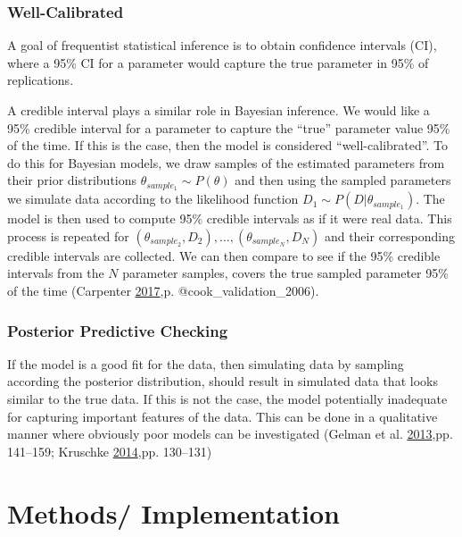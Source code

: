 \documentclass[11pt,a4paper]{article}
\numberwithin{equation}{section}
\begin{document}
\hypertarget{well-calibrated}{%
\subsubsection{Well-Calibrated}\label{well-calibrated}}

A goal of frequentist statistical inference is to obtain confidence
intervals (CI), where a 95\% CI for a parameter would capture the true
parameter in 95\% of replications.

A credible interval plays a similar role in Bayesian inference. We would
like a 95\% credible interval for a parameter to capture the ``true''
parameter value 95\% of the time. If this is the case, then the model is
considered ``well-calibrated''. To do this for Bayesian models, we draw
samples of the estimated parameters from their prior distributions
\(\theta_{sample_1} \sim P(\theta)\) and then using the sampled
parameters we simulate data according to the likelihood function
\(D_{1} \sim P(D|\theta_{sample_1})\). The model is then used to compute
95\% credible intervals as if it were real data. This process is
repeated for
\((\theta_{sample_2}, D_2), \dots, (\theta_{sample_N}, D_N)\) and their
corresponding credible intervals are collected. We can then compare to
see if the 95\% credible intervals from the \(N\) parameter samples,
covers the true sampled parameter 95\% of the time (Carpenter
\protect\hyperlink{ref-carpenter_bayesian_2017}{2017},p.
@cook\_validation\_2006).

\hypertarget{posterior-predictive-checking}{%
\subsubsection{Posterior Predictive
Checking}\label{posterior-predictive-checking}}

If the model is a good fit for the data, then simulating data by
sampling according the posterior distribution, should result in
simulated data that looks similar to the true data. If this is not the
case, the model potentially inadequate for capturing important features
of the data. This can be done in a qualitative manner where obviously
poor models can be investigated (Gelman et al.
\protect\hyperlink{ref-gelman_bayesian_2013}{2013},pp. 141--159;
Kruschke \protect\hyperlink{ref-kruschke_doing_2014}{2014},pp. 130--131)

\hypertarget{methods-implementation}{%
\section{Methods/ Implementation}\label{methods-implementation}}
\end{document}
